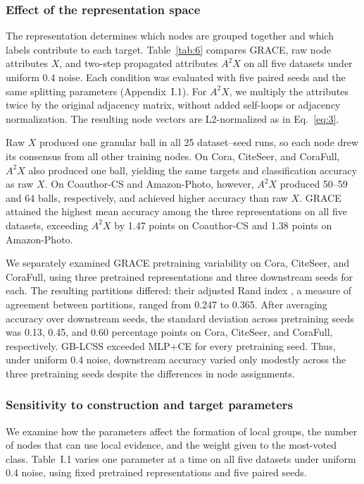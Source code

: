 \subsubsection{Effect of the representation space}\label{sec:4.3.3}

The representation determines which nodes are grouped together and which labels contribute to each target. Table~\ref{tab:6} compares GRACE, raw node attributes \(X\), and two-step propagated attributes \(A^2X\) on all five datasets under uniform 0.4 noise. Each condition was evaluated with five paired seeds and the same splitting parameters (Appendix~I.1). For \(A^2X\), we multiply the attributes twice by the original adjacency matrix, without added self-loops or adjacency normalization. The resulting node vectors are L2-normalized as in Eq.~\eqref{eq:3}.



Raw \(X\) produced one granular ball in all 25 dataset--seed runs, so each node drew its consensus from all other training nodes. On Cora, CiteSeer, and CoraFull, \(A^2X\) also produced one ball, yielding the same targets and classification accuracy as raw \(X\). On Coauthor-CS and Amazon-Photo, however, \(A^2X\) produced 50--59 and 64 balls, respectively, and achieved higher accuracy than raw \(X\). GRACE attained the highest mean accuracy among the three representations on all five datasets, exceeding \(A^2X\) by 1.47 points on Coauthor-CS and 1.38 points on Amazon-Photo.

We separately examined GRACE pretraining variability on Cora, CiteSeer, and CoraFull, using three pretrained representations and three downstream seeds for each. The resulting partitions differed: their adjusted Rand index \cite{ref74}, a measure of agreement between partitions, ranged from 0.247 to 0.365. After averaging accuracy over downstream seeds, the standard deviation across pretraining seeds was 0.13, 0.45, and 0.60 percentage points on Cora, CiteSeer, and CoraFull, respectively. GB-LCSS exceeded MLP+CE for every pretraining seed. Thus, under uniform 0.4 noise, downstream accuracy varied only modestly across the three pretraining seeds despite the differences in node assignments.

\subsubsection{Sensitivity to construction and target parameters}\label{sec:4.3.4}

We examine how the parameters affect the formation of local groups, the number of nodes that can use local evidence, and the weight given to the most-voted class. Table~I.1 varies one parameter at a time on all five datasets under uniform 0.4 noise, using fixed pretrained representations and five paired seeds.


